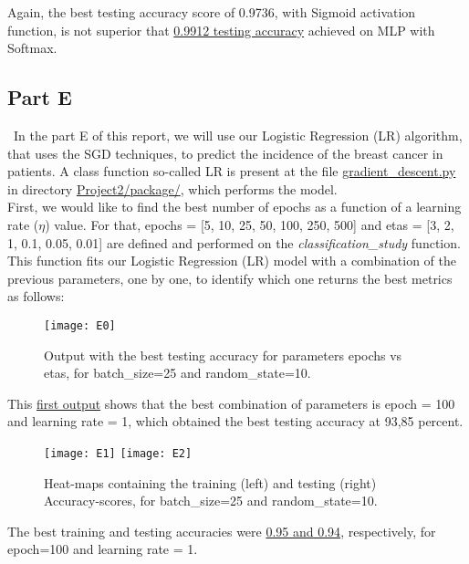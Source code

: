 Again, the best testing accuracy score of 0.9736, with Sigmoid activation function, is not superior that \hyperref[fig:D23]{0.9912 testing accuracy} achieved on MLP with Softmax.

\subsection{Part E}
\label{chap:Part E}

\quad \, In the part E of this report, we will use our Logistic Regression (LR) algorithm, that uses the SGD techniques, to predict the incidence of the breast cancer in patients. A class function so-called LR is present at the file \href{https://github.com/fabiorodp/UiO-FYS-STK4155/blob/master/Project2/package/gradient\_descent.py}{gradient\_descent.py} in directory \href{https://github.com/fabiorodp/UiO-FYS-STK4155/blob/master/Project2/package/}{Project2/package/}, which performs the model.\\

First, we would like to find the best number of epochs as a function of a learning rate ($\eta$) value. For that, epochs = [5, 10, 25, 50, 100, 250, 500] and etas = [3, 2, 1, 0.1, 0.05, 0.01] are defined and performed on the \textit{classification\_study} function. This function fits our Logistic Regression (LR) model with a combination of the previous parameters, one by one, to identify which one returns the best metrics as follows:

\begin{figure}[H]
\label{fig:E0}
\centering
\texttt{[image: E0]}
\caption{Output with the best testing accuracy for parameters epochs vs etas, for batch\_size=25 and random\_state=10.}
\end{figure}

This \hyperref[fig:E0]{first output} shows that the best combination of parameters is epoch = 100 and learning rate = 1, which obtained the best testing accuracy at 93,85 percent.

\begin{figure}[H]
\label{fig:E1}
\centering
\texttt{[image: E1]}
\texttt{[image: E2]}
\caption{Heat-maps containing the training (left) and testing (right) Accuracy-scores, for batch\_size=25 and random\_state=10.}
\end{figure}

The best training and testing accuracies were \hyperref[fig:E1]{0.95 and 0.94}, respectively, for epoch=100 and learning rate = 1.\\

